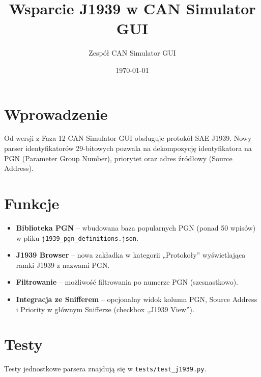 \documentclass[a4paper,12pt]{article}
\title{Wsparcie J1939 w CAN Simulator GUI}
\author{Zespół CAN Simulator GUI}
\date{\today}
\begin{document}
\maketitle
\section{Wprowadzenie}
Od wersji z Faza 12 CAN Simulator GUI obsługuje protokół SAE J1939. Nowy parser identyfikatorów 29-bitowych pozwala na dekompozycję identyfikatora na PGN (Parameter Group Number), priorytet oraz adres źródłowy (Source Address).

\section{Funkcje}
\begin{itemize}
    \item \textbf{Biblioteka PGN} – wbudowana baza popularnych PGN (ponad 50 wpisów) w pliku \texttt{j1939\_pgn\_definitions.json}.
    \item \textbf{J1939 Browser} – nowa zakładka w kategorii „Protokoły” wyświetlająca ramki J1939 z nazwami PGN.
    \item \textbf{Filtrowanie} – możliwość filtrowania po numerze PGN (szesnastkowo).
    \item \textbf{Integracja ze Snifferem} – opcjonalny widok kolumn PGN, Source Address i Priority w głównym Snifferze (checkbox „J1939 View”).
\end{itemize}
\section{Testy}
Testy jednostkowe parsera znajdują się w \texttt{tests/test\_j1939.py}.
\end{document}
